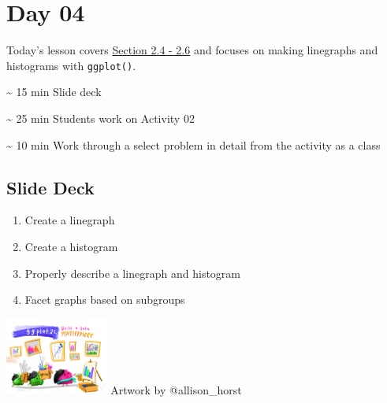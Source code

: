 \documentclass[
  letterpaper,
  DIV=11,
  numbers=noendperiod]{scrreprt}
\providecommand{\tightlist}{%
  \setlength{\itemsep}{0pt}\setlength{\parskip}{0pt}}\usepackage{longtable,booktabs,array}
\begin{document}

\hypertarget{day-04}{%
\chapter*{Day 04}\label{day-04}}

Today's lesson covers
\href{https://nustat.github.io/intro-stat-data-sci/02-visualization.html}{Section
2.4 - 2.6} and focuses on making linegraphs and histograms with
\texttt{ggplot()}.

\begin{tcolorbox}[enhanced jigsaw, toptitle=1mm, colback=white, arc=.35mm, rightrule=.15mm, titlerule=0mm, left=2mm, breakable, bottomtitle=1mm, bottomrule=.15mm, leftrule=.75mm, title={Agenda}, colframe=quarto-callout-note-color-frame, opacitybacktitle=0.6, toprule=.15mm, colbacktitle=quarto-callout-note-color!10!white, coltitle=black, opacityback=0]
\textasciitilde{} 15 min Slide deck

\textasciitilde{} 25 min Students work on Activity 02

\textasciitilde{} 10 min Work through a select problem in detail from
the activity as a class
\end{tcolorbox}

\hypertarget{slide-deck-3}{%
\section*{Slide Deck}\label{slide-deck-3}}

\begin{tcolorbox}[enhanced jigsaw, breakable, colback=white, bottomrule=.15mm, leftrule=.75mm, colframe=quarto-callout-note-color-frame, arc=.35mm, rightrule=.15mm, toprule=.15mm, left=2mm, opacityback=0]

\begin{enumerate}
\def\labelenumi{\arabic{enumi}.}
\tightlist
\item
  Create a linegraph
\item
  Create a histogram
\item
  Properly describe a linegraph and histogram
\item
  Facet graphs based on subgroups
\end{enumerate}

\includegraphics[width=\textwidth,height=1in]{images/images_horst/ggplot2_masterpiece.png}
Artwork by @allison\_horst

\end{tcolorbox}
\end{document}
